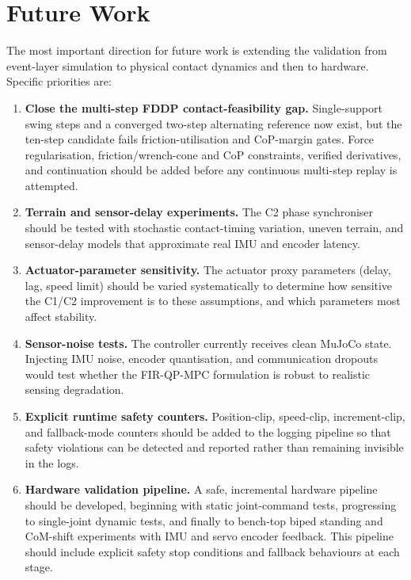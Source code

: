 \documentclass[12pt,a4paper]{report}
\begin{document}
\section{Future Work}
 
The most important direction for future work is extending the validation from event-layer simulation to physical contact dynamics and then to hardware. Specific priorities are:
 
\begin{enumerate}[label=\arabic*.]
    \item \textbf{Close the multi-step FDDP contact-feasibility gap.} Single-support swing steps and a converged two-step alternating reference now exist, but the ten-step candidate fails friction-utilisation and CoP-margin gates. Force regularisation, friction/wrench-cone and CoP constraints, verified derivatives, and continuation should be added before any continuous multi-step replay is attempted.
    \item \textbf{Terrain and sensor-delay experiments.} The C2 phase synchroniser should be tested with stochastic contact-timing variation, uneven terrain, and sensor-delay models that approximate real IMU and encoder latency.
    \item \textbf{Actuator-parameter sensitivity.} The actuator proxy parameters (delay, lag, speed limit) should be varied systematically to determine how sensitive the C1/C2 improvement is to these assumptions, and which parameters most affect stability.
    \item \textbf{Sensor-noise tests.} The controller currently receives clean MuJoCo state. Injecting IMU noise, encoder quantisation, and communication dropouts would test whether the FIR-QP-MPC formulation is robust to realistic sensing degradation.
    \item \textbf{Explicit runtime safety counters.} Position-clip, speed-clip, increment-clip, and fallback-mode counters should be added to the logging pipeline so that safety violations can be detected and reported rather than remaining invisible in the logs.
    \item \textbf{Hardware validation pipeline.} A safe, incremental hardware pipeline should be developed, beginning with static joint-command tests, progressing to single-joint dynamic tests, and finally to bench-top biped standing and CoM-shift experiments with IMU and servo encoder feedback. This pipeline should include explicit safety stop conditions and fallback behaviours at each stage.
\end{enumerate}
 
\end{document}
